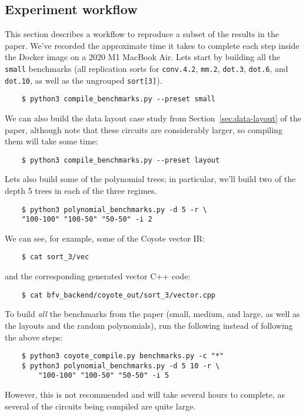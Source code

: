\subsection{Experiment workflow}
This section describes a workflow to reproduce a subset of the results in the paper.
We've recorded the approximate time it takes to complete each step inside the Docker image on a 2020 M1 MacBook Air.
Lets start by building all the {\tt small} benchmarks (all replication sorts for {\tt conv.4.2}, {\tt mm.2}, {\tt dot.3}, {\tt dot.6}, and {\tt dot.10}, as well as the ungrouped {\tt sort[3]}). 
\begin{verbatim}
    $ python3 compile_benchmarks.py --preset small    
\end{verbatim}
We can also build the data layout case study from Section~\ref{sec:data-layout} of the paper, although note that these circuits are considerably larger, so compiling them will take some time:
\begin{verbatim}
    $ python3 compile_benchmarks.py --preset layout    
\end{verbatim}
Lets also build some of the polynomial trees; in particular, we'll build two of the depth 5 trees in each of the three regimes.
\begin{verbatim}
    $ python3 polynomial_benchmarks.py -d 5 -r \
    "100-100" "100-50" "50-50" -i 2    
\end{verbatim}

We can see, for example, some of the Coyote vector IR:
\begin{verbatim}
    $ cat sort_3/vec    
\end{verbatim}
and the corresponding generated vector C++ code:
\begin{verbatim}
    $ cat bfv_backend/coyote_out/sort_3/vector.cpp    
\end{verbatim}

To build {\em all} the benchmarks from the paper (small, medium, and large, as well as the layouts and the random polynomials), run the following instead of following the above steps:
\begin{verbatim}
    $ python3 coyote_compile.py benchmarks.py -c "*"
    $ python3 polynomial_benchmarks.py -d 5 10 -r \
        "100-100" "100-50" "50-50" -i 5    
\end{verbatim}
However, this is not recommended and will take several hours to complete, as several of the circuits being compiled are quite large.

